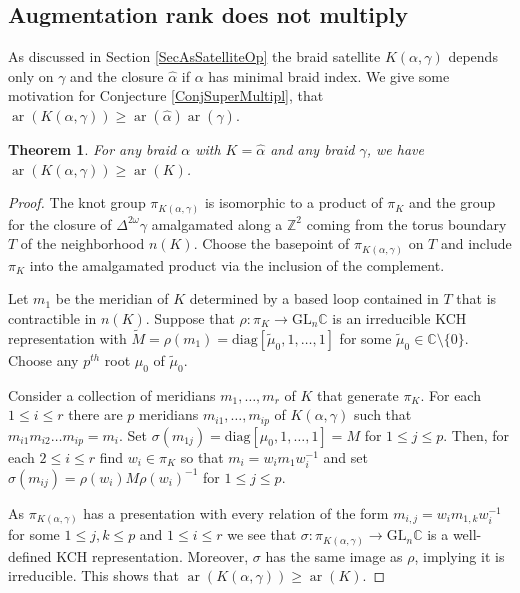 \documentclass[11pt]{amsart}
\def\s{{\sigma}}
\def\ar{\operatorname{ar}}
\newtheorem{thm}{Theorem}[section]
\theoremstyle{definition}
\begin{document}
\subsection{Augmentation rank does not multiply}
\label{SecMultiplic}

As discussed in Section \ref{SecAsSatelliteOp} the braid satellite $K(\alpha,\gamma)$ depends only on $\gamma$ and the closure $\hat{\alpha}$ if $\alpha$ has minimal braid index. We give some motivation for Conjecture \ref{ConjSuperMultipl}, that $\ar(K(\alpha,\gamma))\ge \ar(\hat{\alpha})\ar(\hat{\gamma})$.

\begin{thm}For any braid $\alpha$ with $K=\hat{\alpha}$ and any braid $\gamma$, we have $\ar(K(\alpha,\gamma)) \ge \ar(K)$.
\label{ThmCompanionRank}
\end{thm}
\begin{proof}The knot group $\pi_{K(\alpha,\gamma)}$ is isomorphic to a product of $\pi_K$ and the group for the closure of $\Delta^{2\omega}\gamma$ amalgamated along a $\mathbb Z^2$ coming from the torus boundary $T$ of the neighborhood $n(K)$. Choose the basepoint of $\pi_{K(\alpha,\gamma)}$ on $T$ and include $\pi_K$ into the amalgamated product via the inclusion of the complement.

Let $m_1$ be the meridian of $K$ determined by a based loop contained in $T$ that is contractible in $n(K)$. Suppose that $\rho:\pi_K\to\text{GL}_n\mathbb C$ is an irreducible KCH representation with $\widetilde M = \rho(m_1) = \text{diag}[\widetilde\mu_0,1,\ldots,1]$ for some $\widetilde\mu_0\in\mathbb C\setminus\{0\}$. Choose any $p^{th}$ root $\mu_0$ of $\widetilde\mu_0$. 

Consider a collection of meridians $m_1,\ldots,m_r$ of $K$ that generate $\pi_K$. For each $1\le i\le r$ there are $p$ meridians $m_{i1},\ldots,m_{ip}$ of $K(\alpha,\gamma)$ such that $m_{i1}m_{i2}\ldots m_{ip} = m_i$. Set $\s(m_{1j}) = \text{diag}[\mu_0,1,\ldots,1] = M$ for $1\le j\le p$. Then, for each $2\le i\le r$ find $w_i\in\pi_K$ so that $m_i = w_im_1w_i^{-1}$ and set $\s(m_{ij}) = \rho(w_i)M\rho(w_i)^{-1}$ for $1\le j\le p$.

As $\pi_{K(\alpha,\gamma)}$ has a presentation with every relation of the form $m_{i,j} = w_im_{1,k}w_i^{-1}$ for some $1\le j, k\le p$ and $1\le i\le r$ we see that $\s:\pi_{K(\alpha,\gamma)}\to\text{GL}_n\mathbb C$ is a well-defined KCH representation. Moreover, $\s$ has the same image as $\rho$, implying it is irreducible. This shows that $\ar(K(\alpha,\gamma))\ge \ar(K)$.
\end{proof}
\end{document}
